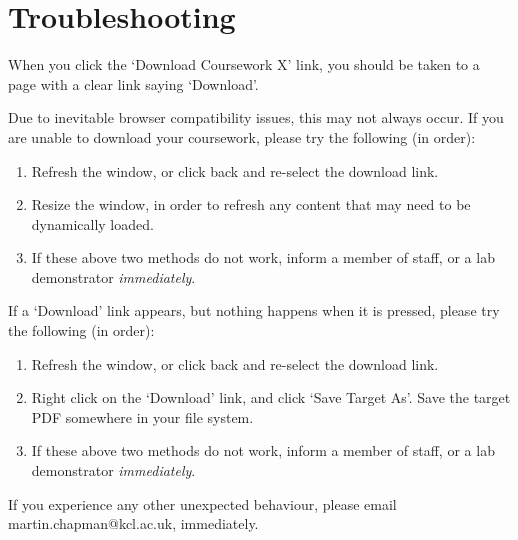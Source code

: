 \documentclass[11pt]{article}
\begin{document}
\section{Troubleshooting}

When you click the `Download Coursework X' link, you should be taken to a page with a clear link saying `Download'.

Due to inevitable browser compatibility issues, this may not always occur. If you are unable to download your coursework, please try the following (in order):

\begin{enumerate}

	\item Refresh the window, or click back and re-select the download link.
	
	\item Resize the window, in order to refresh any content that may need to be dynamically loaded.

	\item If these above two methods do not work, inform a member of staff, or a lab demonstrator \emph{immediately}.

\end{enumerate}

If a `Download' link appears, but nothing happens when it is pressed, please try the following (in order):

\begin{enumerate}
	
	\item Refresh the window, or click back and re-select the download link.
	
	\item Right click on the `Download' link, and click `Save Target As'. Save the target PDF somewhere in your file system.
	
	\item If these above two methods do not work, inform a member of staff, or a lab demonstrator \emph{immediately}.
	
\end{enumerate}
 
If you experience any other unexpected behaviour, please email martin.chapman@kcl.ac.uk, immediately.
  
\end{document}
